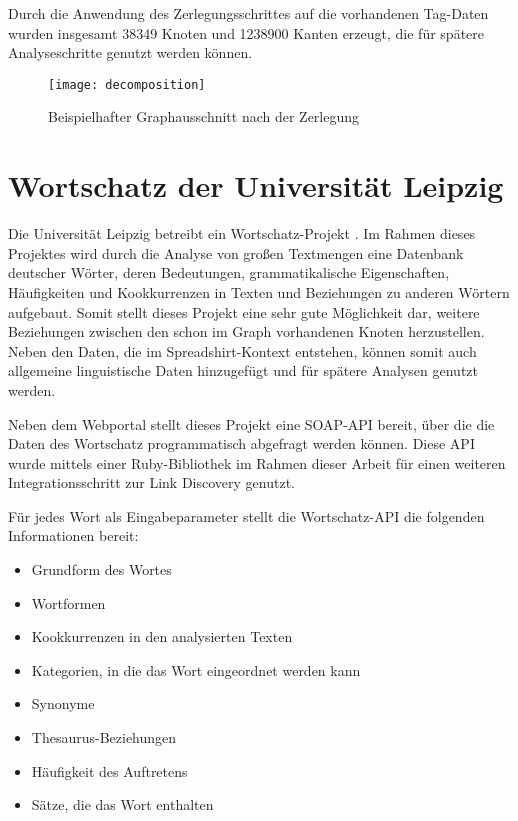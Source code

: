 Durch die Anwendung des Zerlegungsschrittes auf die vorhandenen Tag-Daten wurden insgesamt \num{38349} Knoten und \num{1238900} Kanten erzeugt, die für spätere Analyseschritte genutzt werden können.

\begin{figure}
\centering
\texttt{[image: decomposition]}
\caption{Beispielhafter Graphausschnitt nach der Zerlegung}
\label{fig:decomposition}
\end{figure}

\section{Wortschatz der Universität Leipzig}

Die Universität Leipzig betreibt ein Wortschatz-Projekt \cite{ws2013}. Im Rahmen dieses Projektes wird durch die Analyse von großen Textmengen eine Datenbank deutscher Wörter, deren Bedeutungen, grammatikalische Eigenschaften, Häufigkeiten und Kookkurrenzen in Texten und Beziehungen zu anderen Wörtern aufgebaut. Somit stellt dieses Projekt eine sehr gute Möglichkeit dar, weitere Beziehungen zwischen den schon im Graph vorhandenen Knoten herzustellen. Neben den Daten, die im Spreadshirt-Kontext entstehen, können somit auch allgemeine linguistische Daten hinzugefügt und für spätere Analysen genutzt werden.

Neben dem Webportal stellt dieses Projekt eine SOAP-API bereit, über die die Daten des Wortschatz programmatisch abgefragt werden können. Diese API wurde mittels einer Ruby-Bibliothek \cite{wlapi2013} im Rahmen dieser Arbeit für einen weiteren Integrationsschritt zur Link Discovery genutzt.

Für jedes Wort als Eingabeparameter stellt die Wortschatz-API die folgenden Informationen bereit:

\begin{itemize}
    \item Grundform des Wortes
    \item Wortformen
    \item Kookkurrenzen in den analysierten Texten
    \item Kategorien, in die das Wort eingeordnet werden kann
    \item Synonyme
    \item Thesaurus-Beziehungen
    \item Häufigkeit des Auftretens
    \item Sätze, die das Wort enthalten
\end{itemize}

